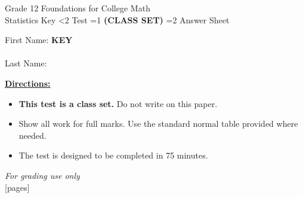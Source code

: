 \documentclass[addpoints]{exam}
\newcommand{\event}{Statistics}
\newcommand{\tournament}{}
\def\type{0}
\begin{document}
\begin{center}
    {\huge Grade 12 Foundations for College Math \\ \event
    \ifprintanswers \space Key
    \else \space \ifnum\type<2 Test \fi \ifnum\type=1 \textbf{(CLASS SET)} \fi
          \ifnum\type=2 Answer Sheet \fi
    \fi \\ \vspace{3mm}\tournament\vspace{1mm}}
\end{center}

\vspace{.25\textheight}

\begin{center}
    First Name: \ifprintanswers
    \underline{\hspace{3.5cm}}\textbf{KEY}\underline{\hspace{5.5cm}}\\\vspace{5mm}
    \else \underline{\hspace{10cm}}\\ \vspace{5mm} \fi
    Last Name: \underline{\hspace{10cm}}\\ \vspace{5mm}
\end{center}

\noindent\textbf{\underline{Directions:}}
\begin{itemize}
    \ifnum\type=1 \item \textbf{This test is a class set.} Do not write on this paper. \fi
    \item Show all work for full marks. Use the standard normal table provided where needed.
    \item The test is designed to be completed in 75 minutes.
\end{itemize}
\begin{center}
\textit{For grading use only}\\
[pages]
\end{center}
\end{document}

